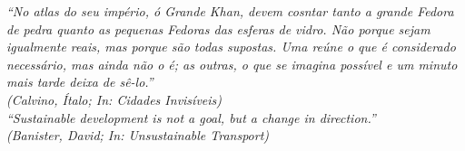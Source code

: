 \documentclass[
  12pt,        %
  openright,      %
  twoside,      %
  a4paper,      %
  english,      %
  brazil        %
]{abntex2}
\begin{document}
\begin{epigrafe}
    \vspace*{\fill}
  \begin{flushright}  
        \textit{``No atlas do seu império, ó Grande Khan, devem cosntar tanto a grande Fedora de pedra quanto as pequenas Fedoras das esferas de vidro. Não porque sejam igualmente reais, mas porque são todas supostas. Uma reúne o que é considerado necessário, mas ainda não o é; as outras, o que se imagina possível e um minuto mais tarde deixa de sê-lo.''\\
    (Calvino, Ítalo; In: Cidades Invisíveis)}\\%
        \textit{``Sustainable development is not a goal, but a change in direction.''\\
    (Banister, David; In: Unsustainable Transport)}\\
    
  \end{flushright}
\end{epigrafe}

\end{document}

